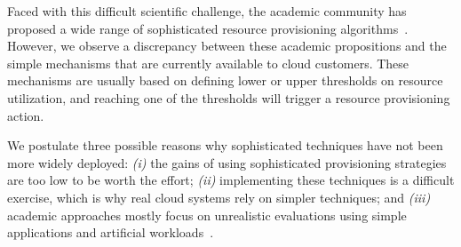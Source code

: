 Faced with this difficult scientific challenge, the academic community
has proposed a wide range of sophisticated resource provisioning
algorithms~\cite{xxx,yyy,zzz}. 
However, we observe a discrepancy between these academic propositions
and the simple mechanisms that are currently available to  
cloud customers. These mechanisms are usually based on defining 
lower or upper thresholds on resource utilization, and reaching one of the
thresholds will trigger a resource provisioning action. 

We postulate three possible reasons why sophisticated
techniques have not been more widely deployed: \emph{(i)} the gains of
using sophisticated provisioning strategies are too low to be worth
the effort; \emph{(ii)} implementing these techniques is a difficult
exercise, which is why real cloud systems rely on simpler techniques;
and \emph{(iii)} academic approaches mostly focus on unrealistic
evaluations using simple applications and artificial
workloads~\cite{do_profiling_2011, islam_empirical_2012,
wang_appraise:_2009}. %

